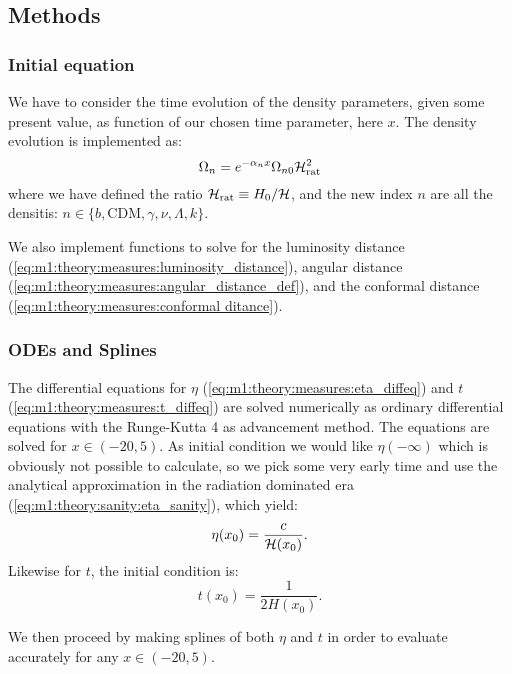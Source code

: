 \subsection{Methods}\label{sec:m1:methods}

\subsubsection{Initial equation}
    We have to consider the time evolution of the density parameters, given some present value, as function of our chosen time parameter, here $x$. The density evolution is implemented as:
    \begin{equation}\label{eq:m1:methods:initial:density_evolution}
        \Omega_n = e^{-\alpha_nx}\Omega_{n0}\mathcal{H}_\mathrm{rat}^2
    \end{equation}
    where we have defined the ratio $\mathcal{H}_\mathrm{rat} \equiv H_0/\mathcal{H}$, and the new index $n$ are all the densitis: $n\in\{b, \mathrm{CDM}, \gamma, \nu, \Lambda, k\}$.

    We also implement functions to solve for the luminosity distance (\cref{eq:m1:theory:measures:luminosity_distance}), angular distance (\cref{eq:m1:theory:measures:angular_distance_def}), and the conformal distance (\cref{eq:m1:theory:measures:conformal ditance}).


\subsubsection{ODEs and Splines}
    The differential equations for $\eta$ (\cref{eq:m1:theory:measures:eta_diffeq}) and $t$ (\cref{eq:m1:theory:measures:t_diffeq}) are solved numerically as ordinary differential equations with the Runge-Kutta 4 as advancement method. The equations are solved for $x\in(-20,5)$. As initial condition we would like $\eta(-\infty)$ which is obviously not possible to calculate, so we pick some very early time and use the analytical approximation in the radiation dominated era (\cref{eq:m1:theory:sanity:eta_sanity}), which yield:
    \begin{equation}\label{eq:m1:methods:odes:eta_initial}
        \eta(x_0) = \frac{c}{\mathcal{H}(x_0)}.
    \end{equation}
    Likewise for $t$, the initial condition is:
    \begin{equation}\label{eq:m1:methods:odes:t_initial}
        t(x_0) = \frac{1}{2H(x_0)}.
    \end{equation}
    
    We then proceed by making splines of both $\eta$ and $t$ in order to evaluate accurately for any $x\in(-20,5)$. 



